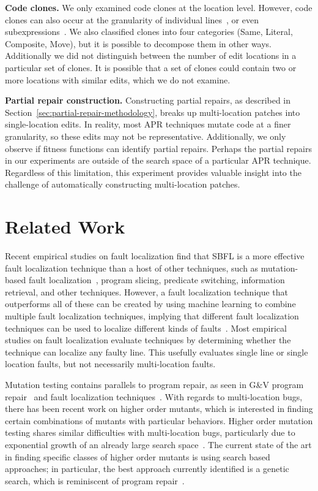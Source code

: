 \documentclass[10pt, conference]{IEEEtran}
\begin{document}
\vspace{1ex}
\noindent\textbf{Code clones.}
We only examined code clones at the location level.  However, code clones can also occur at the
granularity of individual lines~\cite{JiaClones}, or even
subexpressions~\cite{microclones}. We also classified clones into four
categories (Same, Literal, Composite, Move), but it is possible to decompose
them in other ways.
%
Additionally we did not distinguish between the number
of edit locations in a particular set of clones. It is possible that a set of
clones could contain two or more locations with similar edits, which we do not examine. 

\vspace{1ex}
\noindent\textbf{Partial repair construction.}
Constructing partial repairs, as described in
Section~\ref{sec:partial-repair-methodology}, breaks up multi-location patches
into single-location edits.
In reality, most APR techniques mutate code at a finer granularity, so
these edits may not be representative.  Additionally, we only observe if fitness
functions can identify partial repairs. Perhaps the
partial repairs in our experiments are outside of the search space of a
particular APR technique.
Regardless of this limitation, this experiment provides valuable 
insight into the challenge of automatically constructing
multi-location patches.

\section{Related Work}
\label{sec:related}

Recent empirical studies on fault localization find that 
SBFL is a more effective fault localization technique than a host of other techniques, such as 
mutation-based fault localization~\cite{pearson2017evaluating, mut-analysis}, program 
slicing, predicate switching,  information retrieval, and other techniques. 
However, a fault localization 
technique that outperforms all of these can be created by using machine learning to combine 
multiple fault localization techniques, implying that different fault localization techniques can 
be used to localize different kinds of faults~\cite{zou2019empirical}. Most empirical 
studies on fault localization evaluate techniques by determining whether the 
technique can localize any faulty line. This usefully evaluates single line or single 
location faults, but not necessarily multi-location faults.

Mutation testing contains parallels to program repair, as seen in G\&V
program repair~\cite{weimer2013leveraging} and fault 
localization techniques~\cite{metallaxis,muse,mbfl-survey}. With regards to multi-location 
bugs, there has been recent work on higher order mutants, which is interested in finding 
certain combinations of mutants with particular behaviors. Higher order mutation testing 
shares similar difficulties with multi-location bugs, particularly due to exponential growth of 
an already large search 
space~\cite{long-search-spaces}. The current state of the art in finding specific classes of 
higher order mutants is using search based approaches; in particular, the best approach 
currently identified is a genetic search, which is reminiscent of program repair~\cite{homs, 
genprog}.
\end{document}
